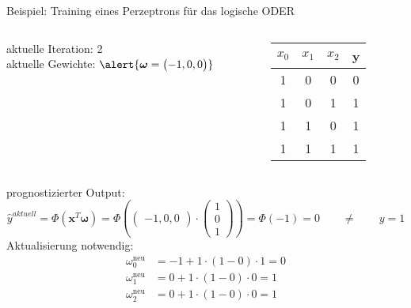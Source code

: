 \documentclass[11pt, aspectratio=169]{beamer}
\begin{document}
\begin{frame}{Beispiel: Training eines Perzeptrons für das logische ODER}
\begin{small}
\begin{columns}
\begin{column}{0.5\textwidth}
aktuelle Iteration:  2\\
aktuelle Gewichte: $\alert{\boldsymbol{\omega} = \begin{pmatrix} -1, 0, 0 \end{pmatrix}}$ \\
\end{column}
\begin{column}{0.4\textwidth}  %
\begin{center} \begin{footnotesize}
\begin{tabular}{cccc} \toprule
$x_0$ & $x_1$ & $x_2$ & y \\ \midrule
1 & 0 & 0 & 0 \\
1 & 0 & 1 & 1 \\
1 & 1 & 0 & 1 \\
1 & 1 & 1 & 1 \\ \bottomrule
\end{tabular} \end{footnotesize}
\end{center}
\end{column}
\end{columns}
prognostizierter Output:
\[\hat{y}^{aktuell} = \Phi(\mathbf{x}^{T}\boldsymbol{\omega}) = \Phi\left( \begin{pmatrix} -1, 0, 0 \end{pmatrix}\cdot \begin{pmatrix} 1 \\ 0 \\ 1 \end{pmatrix} \right) = \Phi(-1) = 0 \qquad \neq \qquad y = 1\]
Aktualisierung notwendig:
\begin{align*}
\omega_0^{\text{neu}} &= -1 + 1\cdot (1-0)\cdot 1 = 0\\
\omega_1^{\text{neu}} &= 0 + 1\cdot (1-0)\cdot 0 = 1\\
\omega_2^{\text{neu}} &= 0 + 1\cdot (1-0)\cdot 0 = 1
\end{align*}
\end{small}
\end{frame}
\end{document}
